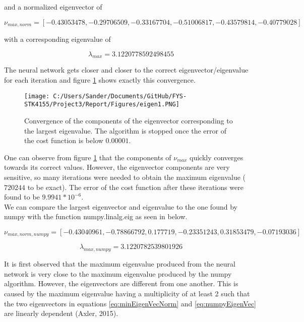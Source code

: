 \documentclass[12pt,a4paper]{article}
\begin{document}
\noindent and a normalized eigenvector of

\begin{equation}\label{eq:minEigenVecNorm}
\nu_{max, norm}=[-0.43053478, -0.29706509, -0.33167704, -0.51006817, -0.43579814, -0.40779028]
\end{equation}

\noindent with a corresponding eigenvalue of 

\begin{equation}\label{eq:minEigenVal}
\lambda_{max} = 3.1220778592498455
\end{equation}

\noindent The neural network gets closer and closer to the correct eigenvector/eigenvalue for each iteration and figure \ref{fig:eigen1} shows exactly this convergence.

\begin{figure}[H]
\centering
\texttt{[image: C:/Users/Sander/Documents/GitHub/FYS-STK4155/Project3/Report/Figures/eigen1.PNG]}
\caption{\label{fig:eigen1} Convergence of the components of the eigenvector corresponding to the largest eigenvalue. The algorithm is stopped once the error of the cost function is below $0.00001$.}
\end{figure}

\noindent One can observe from figure \ref{fig:eigen1} that the components of $\nu_{max}$ quickly converges towards its correct values. However, the eigenvector components are very sensitive, so many iterations were needed to obtain the maximum eigenvalue ($720244$ to be exact). The error of the cost function after these iterations were found to be $9.9941 *10^{-6}$.
\\
We can compare the largest eigenvector and eigenvalue to the one found by numpy with the function numpy.linalg.eig as seen in below.

\begin{equation}\label{eq:numpyEigenVec}
\nu_{max,norm,numpy} = [-0.43040961, -0.78866792, 0.177719, -0.23351243, 0.31853479, -0.07193036]
\end{equation}

\begin{equation}\label{eq:numpyEigenVal}
\lambda_{max,numpy} = 3.1220782539801926
\end{equation}

\noindent It is first observed that the maximum eigenvalue produced from the neural network is very close to the maximum eigenvalue produced by the numpy algorithm. However, the eigenvectors are different from one another. This is caused by the maximum eigenvalue having a multiplicity of at least 2 such that the two eigenvectors in equations \ref{eq:minEigenVecNorm} and \ref{eq:numpyEigenVec} are linearly dependent (Axler, 2015). 
\end{document}
